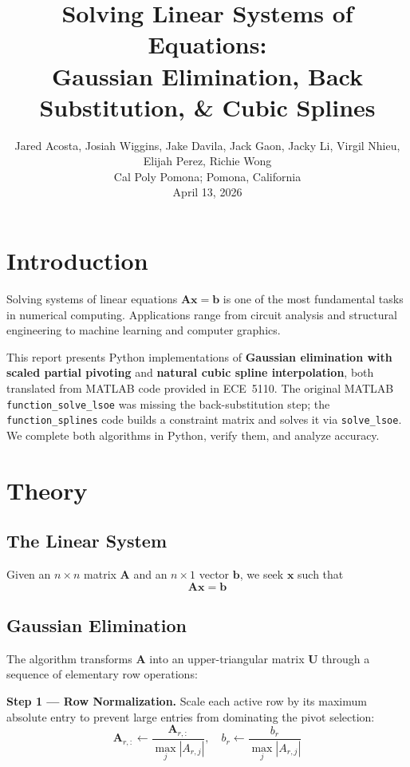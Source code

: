 \documentclass[letterpaper,twocolumn,fleqn]{article}
\title{Solving Linear Systems of Equations:\\
  Gaussian Elimination, Back Substitution, \& Cubic Splines}
\author{ Jared Acosta, Josiah Wiggins, Jake Davila, Jack Gaon, Jacky Li, Virgil Nhieu, Elijah Perez, Richie Wong\\ Cal Poly Pomona; Pomona, California \\ April 13, 2026}
\begin{document}
\maketitle

\section{Introduction}
Solving systems of linear equations $\mathbf{A}\mathbf{x} = \mathbf{b}$
is one of the most fundamental tasks in numerical computing.  Applications
range from circuit analysis and structural engineering to machine learning
and computer graphics.

This report presents Python implementations of \textbf{Gaussian
elimination with scaled partial pivoting} and \textbf{natural cubic
spline interpolation}, both translated from MATLAB code provided in
ECE~5110.  The original MATLAB \texttt{function\_solve\_lsoe} was
missing the back-substitution step; the \texttt{function\_splines} code
builds a constraint matrix and solves it via \texttt{solve\_lsoe}.  We
complete both algorithms in Python, verify them, and analyze accuracy.

\section{Theory}

\subsection{The Linear System}
Given an $n \times n$ matrix $\mathbf{A}$ and an $n \times 1$ vector
$\mathbf{b}$, we seek $\mathbf{x}$ such that
\[
\mathbf{A}\mathbf{x} = \mathbf{b}
\]

\subsection{Gaussian Elimination}
The algorithm transforms $\mathbf{A}$ into an upper-triangular matrix
$\mathbf{U}$ through a sequence of elementary row operations:

\textbf{Step 1 — Row Normalization.}
Scale each active row by its maximum absolute entry to prevent large
entries from dominating the pivot selection:
\[
\mathbf{A}_{r,:} \leftarrow \frac{\mathbf{A}_{r,:}}
                                  {\max_j |A_{r,j}|}, \quad
b_r \leftarrow \frac{b_r}{\max_j |A_{r,j}|}
\]
\end{document}
